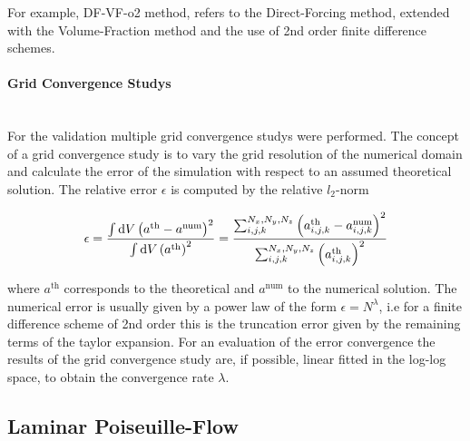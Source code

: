 For example, DF-VF-o2 method, refers to the Direct-Forcing method, extended with the Volume-Fraction
method and the use of 2nd order finite difference schemes.

\paragraph{Grid Convergence Studys}\mbox{}\\

For the validation multiple grid convergence studys were performed.
The concept of a grid convergence study is to vary the grid resolution of the numerical domain and
calculate the error of the simulation with respect to an assumed theoretical solution.
The relative error $\epsilon$ is computed by the relative $l_2$-norm

\begin{align}
    \epsilon = \frac{\int \mathop{}\!\mathrm{d} V \left(a^{\text{th}} - a^{\text{num}}\right)^2}{\int \mathop{}\!\mathrm{d} V \left( a^{\text{th}} \right)^2}
     = \frac{\sum_{i,j,k}^{N_x, N_y, N_z}
      \left(a^{\text{th}}_{i,j,k}  - a^{\text{num}}_{i, j, k}  \right)^2}
     {\sum_{i,j,k}^{N_x, N_y, N_z} \left( a^{\text{th}}_{i,j,k} \right)^2}
 \end{align}

where $a^{\text{th}}$ corresponds to the theoretical and $a^{\text{num}}$ to the numerical solution.
The numerical error is usually given by a power law of the form $\epsilon = N^\lambda$, i.e for a finite difference scheme of 2nd order
this is the truncation error given by the remaining terms  of the taylor expansion.
For an evaluation of the error convergence the results of the grid convergence study are, if possible, linear fitted in the log-log space, to obtain the
convergence rate $\lambda$.




\clearpage

\subsection{Laminar Poiseuille-Flow}

